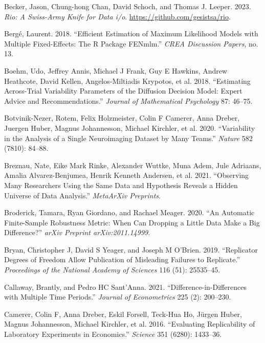 \documentclass[
  letterpaper,
  DIV=11,
  numbers=noendperiod]{scrartcl}
\newlength{\cslhangindent}
\newenvironment{CSLReferences}[2] %
 {\begin{list}{}{%
  \setlength{\itemindent}{0pt}
  \setlength{\leftmargin}{0pt}
  \setlength{\parsep}{0pt}
  \ifodd #1
   \setlength{\leftmargin}{\cslhangindent}
   \setlength{\itemindent}{-1\cslhangindent}
  \fi
  \setlength{\itemsep}{#2\baselineskip}}}
 {\end{list}}
\begin{document}
\begin{CSLReferences}{1}{0}
Becker, Jason, Chung-hong Chan, David Schoch, and Thomas J. Leeper.
2023. \emph{Rio: A Swiss-Army Knife for Data i/o}.
\url{https://github.com/gesistsa/rio}.

Bergé, Laurent. 2018. {``Efficient Estimation of Maximum Likelihood
Models with Multiple Fixed-Effects: The {R} Package {FENmlm}.''}
\emph{CREA Discussion Papers}, no. 13.

Boehm, Udo, Jeffrey Annis, Michael J Frank, Guy E Hawkins, Andrew
Heathcote, David Kellen, Angelos-Miltiadis Krypotos, et al. 2018.
{``Estimating Across-Trial Variability Parameters of the Diffusion
Decision Model: Expert Advice and Recommendations.''} \emph{Journal of
Mathematical Psychology} 87: 46--75.

Botvinik-Nezer, Rotem, Felix Holzmeister, Colin F Camerer, Anna Dreber,
Juergen Huber, Magnus Johannesson, Michael Kirchler, et al. 2020.
{``Variability in the Analysis of a Single Neuroimaging Dataset by Many
Teams.''} \emph{Nature} 582 (7810): 84--88.

Breznau, Nate, Eike Mark Rinke, Alexander Wuttke, Muna Adem, Jule
Adriaans, Amalia Alvarez-Benjumea, Henrik Kenneth Andersen, et al. 2021.
{``Observing Many Researchers Using the Same Data and Hypothesis Reveals
a Hidden Universe of Data Analysis.''} \emph{MetaArXiv Preprints}.

Broderick, Tamara, Ryan Giordano, and Rachael Meager. 2020. {``An
Automatic Finite-Sample Robustness Metric: When Can Dropping a Little
Data Make a Big Difference?''} \emph{arXiv Preprint arXiv:2011.14999}.

Bryan, Christopher J, David S Yeager, and Joseph M O'Brien. 2019.
{``Replicator Degrees of Freedom Allow Publication of Misleading
Failures to Replicate.''} \emph{Proceedings of the National Academy of
Sciences} 116 (51): 25535--45.

Callaway, Brantly, and Pedro HC Sant'Anna. 2021.
{``Difference-in-Differences with Multiple Time Periods.''}
\emph{Journal of Econometrics} 225 (2): 200--230.

Camerer, Colin F, Anna Dreber, Eskil Forsell, Teck-Hua Ho, Jürgen Huber,
Magnus Johannesson, Michael Kirchler, et al. 2016. {``Evaluating
Replicability of Laboratory Experiments in Economics.''} \emph{Science}
351 (6280): 1433--36.


\end{CSLReferences}
\end{document}

